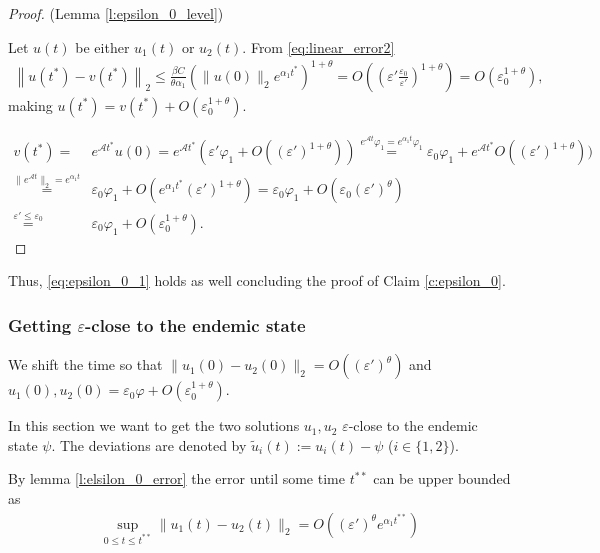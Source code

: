\documentclass{article}
\newcommand{\1}[1]{{\mathds{1}}_{\left\{#1\right\}}}
\begin{document}
\begin{proof}(Lemma \ref{l:epsilon_0_level})
	
	Let $u(t)$ be either $u_1(t)$ or $u_2(t).$ From \eqref{eq:linear_error2}
	\begin{align*}
		\left\|u(t^*)-v(t^*) \right\|_2 \leq \frac{\beta C}{\theta \alpha_1} \left(\| u(0)\|_2e^{ \alpha_1 t^*} \right)^{1+\theta}=O \left(\left(\varepsilon' \frac{\varepsilon_0}{\varepsilon'} \right)^{1+\theta} \right)=O\left(\varepsilon_0^{1+\theta}\right),
	\end{align*}
	making $u(t^*)=v(t^*)+O\left(\varepsilon_0^{1+\theta} \right).$
	
	\begin{align*}
		v(t^*)=&e^{\mathcal{A}t^*}u(0)=e^{\mathcal{A}t^*}\left(\varepsilon'\varphi_1+O\left((\varepsilon')^{1+\theta}\right) \right)\overset{e^{\mathcal{A}t}\varphi_1=e^{\alpha_1 t}\varphi_1}{=}\varepsilon_0\varphi_1+e^{\mathcal{A}t^*}O\left((\varepsilon')^{1+\theta}\right)) \\
		\overset{\|e^{\mathcal{A}t}\|_2=e^{\alpha_1 t}}{=}&\varepsilon_0\varphi_1+ O\left(e^{\alpha_1 t^*}(\varepsilon')^{1+\theta}\right)=\varepsilon_0\varphi_1+O\left(\varepsilon_0 (\varepsilon')^{\theta}\right)\\
		\overset{\varepsilon' \leq \varepsilon_0}{=}&\varepsilon_0\varphi_1+O\left(\varepsilon_0^{1+\theta}\right).
	\end{align*}
\end{proof}

Thus, \eqref{eq:epsilon_0_1} holds as well concluding the proof of Claim \ref{c:epsilon_0}.



\subsubsection{Getting $\varepsilon$-close to the endemic state}
\label{s:close_to_endemic}

We shift the time so that $\|u_1(0)-u_2(0) \|_2=O\left( (\varepsilon')^{\theta} \right)$ and $u_1(0),u_2(0)=\varepsilon_0 \varphi+O\left(\varepsilon_0^{1+\theta} \right).$

In this section we want to get the two solutions $u_1,u_2$ $\varepsilon$-close to the endemic state $\psi$. The deviations are denoted by $\tilde{u}_i(t):=u_i(t)-\psi$ ($i \in \{1,2\}$). 


By lemma \ref{l:elsilon_0_error} the error until some time $t^{**}$ can be upper bounded as
\begin{align}
\label{eq:error_accumulation}
\sup_{0 \leq t \leq t^{**}}\|u_1(t)-u_2(t) \|_2 =O \left((\varepsilon')^{\theta}e^{\alpha_1 t^{**}} \right)
\end{align}  
\end{document}
